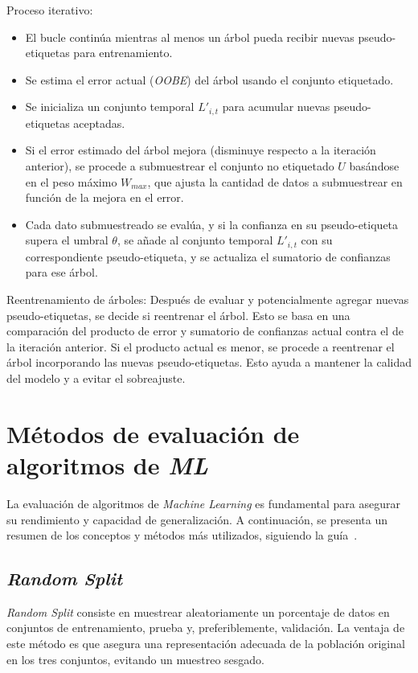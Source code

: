Proceso iterativo:
\begin{itemize}
	\item El bucle continúa mientras al menos un árbol pueda recibir nuevas pseudo-etiquetas para entrenamiento.
	\item Se estima el error actual (\textit{OOBE}) del árbol usando el conjunto etiquetado.
	\item Se inicializa un conjunto temporal $L'_{i,t}$ para acumular nuevas pseudo-etiquetas aceptadas.
	\item Si el error estimado del árbol mejora (disminuye respecto a la iteración anterior), se procede a submuestrear el conjunto no etiquetado $U$ basándose en el peso máximo $W_{max}$, que ajusta la cantidad de datos a submuestrear en función de la mejora en el error.
	\item Cada dato submuestreado se evalúa, y si la confianza en su pseudo-etiqueta supera el umbral $\theta$, se añade al conjunto temporal $L'_{i,t}$ con su correspondiente pseudo-etiqueta, y se actualiza el sumatorio de confianzas para ese árbol.
\end{itemize}

Reentrenamiento de árboles:
Después de evaluar y potencialmente agregar nuevas pseudo-etiquetas, se decide si reentrenar el árbol. Esto se basa en una comparación del producto de error y sumatorio de confianzas actual contra el de la iteración anterior. Si el producto actual es menor, se procede a reentrenar el árbol incorporando las nuevas pseudo-etiquetas. Esto ayuda a mantener la calidad del modelo y a evitar el sobreajuste.

\section{Métodos de evaluación de algoritmos de \textit{ML}}
La evaluación de algoritmos de \textit{Machine Learning} es fundamental para asegurar su rendimiento y capacidad de generalización. A continuación, se presenta un resumen de los conceptos y métodos más utilizados, siguiendo la guía~\cite{web:crossVal}.
\subsection{\textit{Random Split}}
\textit{Random Split} consiste en muestrear aleatoriamente un porcentaje de datos en conjuntos de entrenamiento, prueba y, preferiblemente, validación. La ventaja de este método es que asegura una representación adecuada de la población original en los tres conjuntos, evitando un muestreo sesgado.


